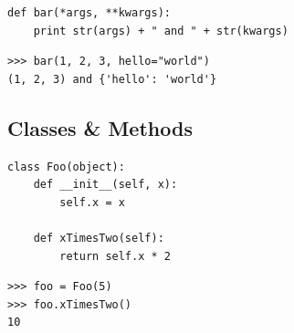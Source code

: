 \documentclass[10pt,a4paper,oneside]{article}
\begin{document}
\begin{landscape}
\begin{multicols}{3}
\begin{verbatim}
def bar(*args, **kwargs):
    print str(args) + " and " + str(kwargs)
\end{verbatim}
\begin{verbatim}
>>> bar(1, 2, 3, hello="world")
(1, 2, 3) and {'hello': 'world'}
\end{verbatim}

\vspace{-0.25cm}
\subsection*{Classes \& Methods}

\begin{verbatim}
class Foo(object):
    def __init__(self, x):
        self.x = x

    def xTimesTwo(self):
        return self.x * 2
\end{verbatim}
\begin{verbatim}
>>> foo = Foo(5)
>>> foo.xTimesTwo()
10
\end{verbatim}
\end{multicols}
\end{landscape}
\end{document}
